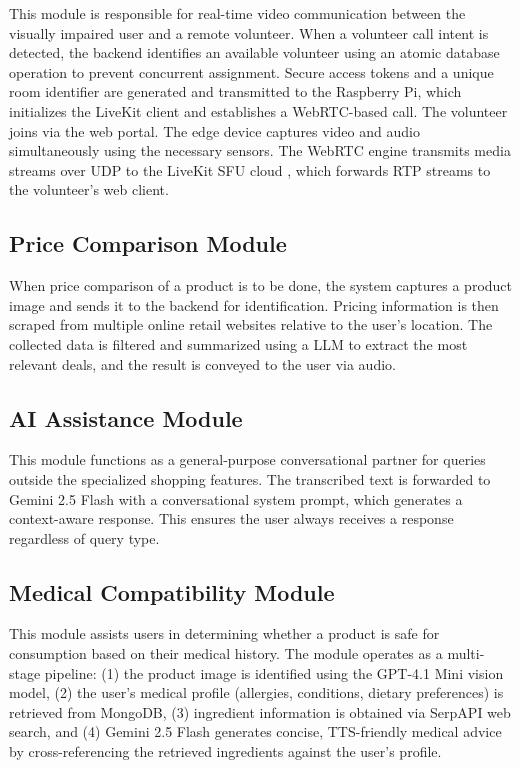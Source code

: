 \documentclass[conference]{IEEEtran}
\begin{document}
This module is responsible for real-time video communication between the visually impaired user and a remote volunteer. When a volunteer call intent is detected, the backend identifies an available volunteer using an atomic database operation to prevent concurrent assignment. Secure access tokens and a unique room identifier are generated and transmitted to the Raspberry Pi, which initializes the LiveKit \cite{b14} client and establishes a WebRTC-based call. The volunteer joins via the web portal. The edge device captures video and audio simultaneously using the necessary sensors. The WebRTC engine transmits media streams over UDP to the LiveKit SFU cloud \cite{b15}, which forwards RTP streams to the volunteer's web client.

\subsection{Price Comparison Module}

When price comparison of a product is to be done, the system captures a product image and sends it to the backend for identification. Pricing information is then scraped from multiple online retail websites relative to the user's location. The collected data is filtered and summarized using a LLM to extract the most relevant deals, and the result is conveyed to the user via audio.

\subsection{AI Assistance Module}

This module functions as a general-purpose conversational partner for queries outside the specialized shopping features. The transcribed text is forwarded to Gemini 2.5 Flash \cite{b13} with a conversational system prompt, which generates a context-aware response. This ensures the user always receives a response regardless of query type.

\subsection{Medical Compatibility Module}

This module assists users in determining whether a product is safe for consumption based on their medical history. The module operates as a multi-stage pipeline: (1) the product image is identified using the GPT-4.1 Mini vision model, (2) the user's medical profile (allergies, conditions, dietary preferences) is retrieved from MongoDB, (3) ingredient information is obtained via SerpAPI web search, and (4) Gemini 2.5 Flash \cite{b13} generates concise, TTS-friendly medical advice by cross-referencing the retrieved ingredients against the user's profile.
\end{document}
